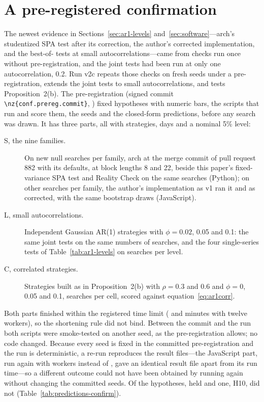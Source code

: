 \section{A pre-registered confirmation}
\label{sec:confirm}

The newest evidence in Sections~\ref{sec:ar1-levels} and~\ref{sec:software}---arch's studentized SPA test after its correction, the author's corrected implementation, and the best-of- tests at small autocorrelations---came from checks run once without pre-registration, and the joint tests had been run at only one autocorrelation, 0.2. Run v2c repeats those checks on fresh seeds under a pre-registration, extends the joint tests to small autocorrelations, and tests Proposition~2(b). The pre-registration (signed commit \nolinkurl{\nz{conf.prereg.commit}}, ) fixed  hypotheses with numeric bars, the scripts that run and score them, the seeds and the closed-form predictions, before any search was drawn. It has three parts, all with  strategies,  days and a nominal 5\% level:
\begin{description}
  \item[S, the nine families.] On  new null searches per family, arch at the merge commit of pull request 882 with its defaults, at block lengths 8 and 22, beside this paper's fixed-variance SPA test and Reality Check on the same searches (Python); on  other searches per family, the author's implementation as v1 ran it and as corrected, with the same bootstrap draws (JavaScript).
  \item[L, small autocorrelations.] Independent Gaussian AR(1) strategies with $\phi=0.02$, 0.05 and 0.1: the same joint tests on the same numbers of searches, and the four single-series tests of Table~\ref{tab:ar1-levels} on  searches per level.
  \item[C, correlated strategies.] Strategies built as in Proposition~2(b) with $\rho=0.3$ and 0.6 and $\phi=0$, 0.05 and 0.1,  searches per cell, scored against equation~\eqref{eq:ar1corr}.
\end{description}
Both parts finished within the registered time limit ( and  minutes with twelve workers), so the shortening rule did not bind. Between the commit and the run both scripts were smoke-tested on another seed, as the pre-registration allows; no code changed. Because every seed is fixed in the committed pre-registration and the run is deterministic, a re-run reproduces the result files---the JavaScript part, run again with  workers instead of , gave an identical result file apart from its run time---so a different outcome could not have been obtained by running again without changing the committed seeds. Of the  hypotheses,  held and one, H10, did not (Table~\ref{tab:predictions-confirm}).

